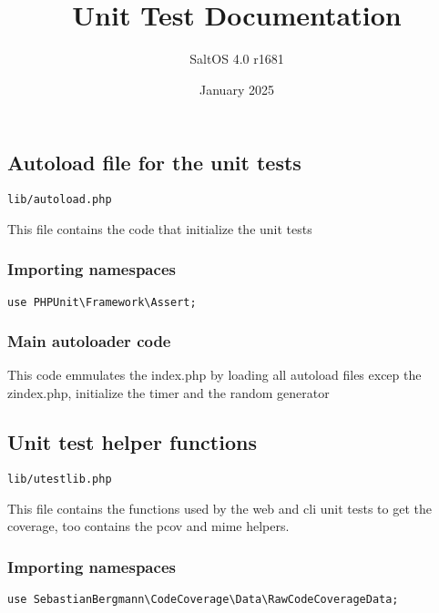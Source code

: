 \documentclass[a4paper]{article}
\title{Unit Test Documentation}
\author{SaltOS 4.0 r1681}
\begin{document}
\date{January 2025}
\maketitle
\clearpage

\tableofcontents
\clearpage

\hypertarget{toc1}{}
\subsection{Autoload file for the unit tests}

\begin{lstlisting}
lib/autoload.php
\end{lstlisting}

This file contains the code that initialize the unit tests

\hypertarget{toc2}{}
\subsubsection{Importing namespaces}

\begin{lstlisting}
use PHPUnit\Framework\Assert;
\end{lstlisting}

\hypertarget{toc3}{}
\subsubsection{Main autoloader code}

This code emmulates the index.php by loading all autoload files excep
the zindex.php, initialize the timer and the random generator

\hypertarget{toc4}{}
\subsection{Unit test helper functions}

\begin{lstlisting}
lib/utestlib.php
\end{lstlisting}

This file contains the functions used by the web and cli unit tests
to get the coverage, too contains the pcov and mime helpers.

\hypertarget{toc5}{}
\subsubsection{Importing namespaces}

\begin{lstlisting}
use SebastianBergmann\CodeCoverage\Data\RawCodeCoverageData;
\end{lstlisting}
\end{document}
